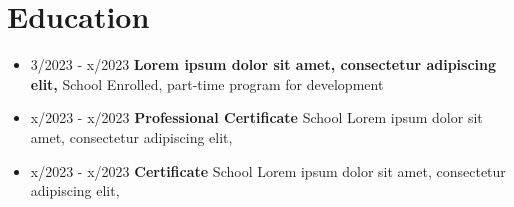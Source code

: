 \documentclass[letterpaper,9pt]{article}
\begin{document}
\section{Education}
\begin{itemize}
    \item[]
		{3/2023 - x/2023}
    \hspace*{6pt}
		{\textbf{Lorem ipsum dolor sit amet, consectetur adipiscing elit,}} \hfill 	School
	\newline
  \hspace*{80pt}
		Enrolled, part-time program for development
    \item[]
		{x/2023 - x/2023}
    \hspace*{6pt}
		{\textbf{Professional Certificate}}  \hfill School
		\newline
    \hspace*{80pt}
   Lorem ipsum dolor sit amet, consectetur adipiscing elit,
	\item[]
		{x/2023 - x/2023}
    \hspace*{6pt}
		{\textbf{Certificate}}  \hfill		School
		\newline
    \hspace*{80pt}
   Lorem ipsum dolor sit amet, consectetur adipiscing elit,
\end{itemize}
    
    \vspace{-10 pt}
\end{document}

